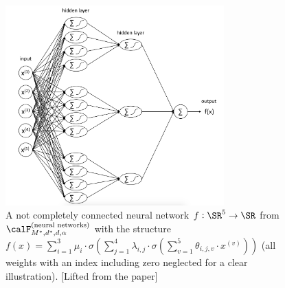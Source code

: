 \begin{figure}[htbp!]
	\centering
	\includegraphics[width=0.75\textwidth]{Figures/DLNPR-Fig1}
	\caption{A not completely connected neural network $f:\SR^5\rightarrow \SR$ from $\calF_{M^*,d^*,d,\alpha}^{\text{(neural networks)}}$ with the structure $f(x) = \sum_{i=1}^3 \mu_i \cdot\sigma(\sum_{j=1}^4 \lambda_{i,j}\cdot\sigma(\sum_{v=1}^5 \theta_{i,j,v} \cdot x^{(v)}))$ (all weights with an index including zero neglected for a clear illustration). [Lifted from the paper]}
	\label{fig:DLNPR-1}
\end{figure}


